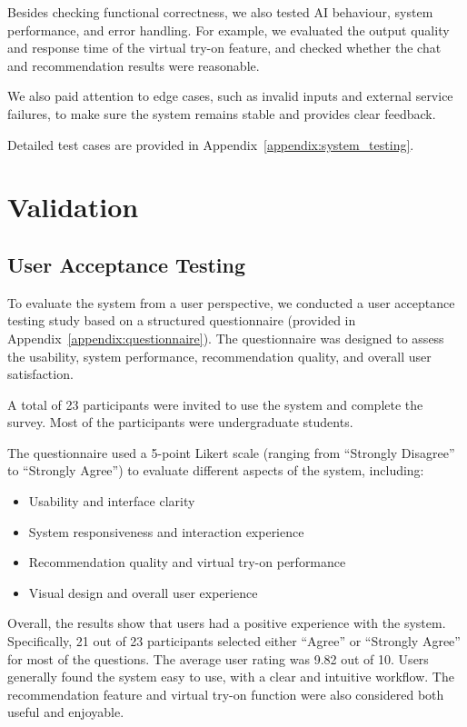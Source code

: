 Besides checking functional correctness, we also tested AI behaviour, system performance, and error handling.  
For example, we evaluated the output quality and response time of the virtual try-on feature, and checked whether the chat and recommendation results were reasonable.

We also paid attention to edge cases, such as invalid inputs and external service failures, to make sure the system remains stable and provides clear feedback.

Detailed test cases are provided in Appendix~\ref{appendix:system_testing}.

\section{Validation}

\subsection{User Acceptance Testing}
To evaluate the system from a user perspective, we conducted a user acceptance testing study based on a structured questionnaire (provided in Appendix~\ref{appendix:questionnaire}). The questionnaire was designed to assess the usability, system performance, recommendation quality, and overall user satisfaction.

A total of 23 participants were invited to use the system and complete the survey. Most of the participants were undergraduate students.

The questionnaire used a 5-point Likert scale (ranging from “Strongly Disagree” to “Strongly Agree”) to evaluate different aspects of the system, including:

\begin{itemize}
    \item Usability and interface clarity
    \item System responsiveness and interaction experience
    \item Recommendation quality and virtual try-on performance
    \item Visual design and overall user experience
\end{itemize}

Overall, the results show that users had a positive experience with the system. Specifically, 21 out of 23 participants selected either “Agree” or “Strongly Agree” for most of the questions. The average user rating was 9.82 out of 10. Users generally found the system easy to use, with a clear and intuitive workflow. The recommendation feature and virtual try-on function were also considered both useful and enjoyable.

